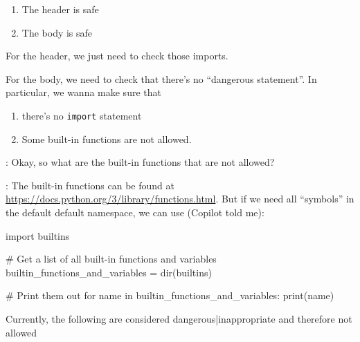 \documentclass[dvipsnames]{article}
\begin{document}
\begin{enumerate}
\item The header is safe
\item The body is safe
\end{enumerate}

For the header, we just need to check those imports.

For the body, we need to check that there's no ``dangerous statement''. In
particular, we wanna make sure that

\begin{enumerate}
\item there's no \texttt{import} statement
\item Some built-in functions are not allowed.
\end{enumerate}

 : Okay, so what are the built-in functions that are not allowed?

 : The built-in functions can be found at
\url{https://docs.python.org/3/library/functions.html}. But if we need all
``symbols'' in the default default namespace, we can use (Copilot told me):

\begin{simplepy}
import builtins

# Get a list of all built-in functions and variables
builtin_functions_and_variables = dir(builtins)

# Print them out
for name in builtin_functions_and_variables:
    print(name)
\end{simplepy}

Currently, the following
are considered dangerous|inappropriate and therefore not allowed
\end{document}
